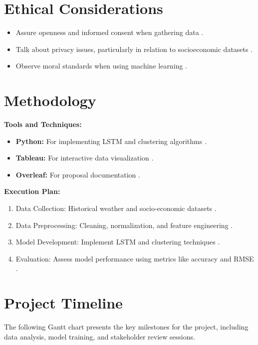\documentclass[a4paper]{report}
\begin{document}
\section*{Ethical Considerations}
\begin{itemize}
    \item Assure openness and informed consent when gathering data \cite{miller2023, smith2024}.
    \item Talk about privacy issues, particularly in relation to socioeconomic datasets \cite{jones2023, evans2024}.
    \item Observe moral standards when using machine learning \cite{anderson2024, foster2023}.
\end{itemize}

\section*{Methodology}
\textbf{Tools and Techniques:}
\begin{itemize}
    \item \textbf{Python:} For implementing LSTM and clustering algorithms \cite{williams2024, green2023}.
    \item \textbf{Tableau:} For interactive data visualization \cite{carter2023, smith2024}.
    \item \textbf{Overleaf:} For proposal documentation \cite{davis2024, thompson2023}.
\end{itemize}

\textbf{Execution Plan:}
\begin{enumerate}
    \item Data Collection: Historical weather and socio-economic datasets \cite{johnson2024, roberts2023}.
    \item Data Preprocessing: Cleaning, normalization, and feature engineering \cite{martin2023, li2024}.
    \item Model Development: Implement LSTM and clustering techniques \cite{roberts2023, miller2023}.
    \item Evaluation: Assess model performance using metrics like accuracy and RMSE \cite{brown2024, harrison2023}.
\end{enumerate}


\section*{Project Timeline}

The following Gantt chart presents the key milestones for the project, including data analysis, model training, and stakeholder review sessions.
\end{document}
